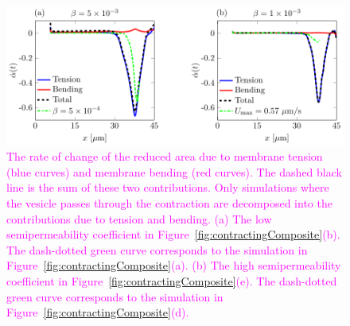 \documentclass[prb,preprint,showpacs,preprintnumbers,amsmath,amssymb,longbibliography]{revtex4-1}
\newif\ifTikz
\begin{document}
\begin{figure}[htp]
  \ifTikz
  
  \else
  \includegraphics{figures/contractingRAdecomp.pdf}
  \fi
  \caption{\label{fig:contractingRAdecomp} \textcolor{magenta}{The rate
  of change of the reduced area due to  membrane tension (blue curves) and membrane bending
  (red curves). The dashed black  line is the sum of these two contributions. Only
  simulations where the vesicle passes through the contraction are
  decomposed into the contributions due to tension and bending. (a) The
  low semipermeability coefficient in
  Figure~\ref{fig:contractingComposite}(b). The dash-dotted green curve corresponds
  to the simulation in Figure~\ref{fig:contractingComposite}(a). (b) The
  high semipermeability coefficient in
  Figure~\ref{fig:contractingComposite}(e). The dash-dotted green curve corresponds
  to the simulation in Figure~\ref{fig:contractingComposite}(d).}}
\end{figure}
\end{document}
